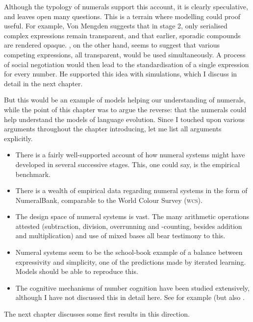 \documentclass{../src/bcthesispart}
\begin{document}


Although the typology of numerals support this account, it is clearly speculative, and leaves open many questions.
This is a terrain where modelling could proof useful.
For example, Von Mengden suggests that in stage 2, only serialised complex expressions remain transparent, and that earlier, sporadic compounds are rendered opaque. 
\textcite{Hurford1987}, on the other hand, seems to suggest that various competing expressions, all transparent, would be used simultaneously.
A process of social negotiation would then lead to the standardisation of a single expression for every number.
He supported this idea with simulations, which I discuss in detail in the next chapter.




But this would be an example of models helping our understanding of numerals, while the point of this chapter was to argue the reverse: that the numerals could help understand the models of language evolution.
Since I touched upon various arguments throughout the chapter introducing, let me list all arguments explicitly.
\begin{itemize}
\item There is a fairly well-supported account of how numeral systems might have developed in several successive stages. This, one could say, is the empirical benchmark.

\item There is a wealth of empirical data regarding numeral systems in the form of NumeralBank, comparable to the World Colour Survey (\textsc{wcs}). 


\item The design space of numeral systems is vast. The many arithmetic operations attested (subtraction, division, overrunning and -counting, besides addition and multiplication) and use of mixed bases all bear testimony to this. 

\item Numeral systems seem to be the school-book example of a balance between expressivity and simplicity, one of the predictions made by iterated learning. Models should be able to reproduce this.

\item The cognitive mechanisms of number cognition have  been studied extensively, although I have not discussed this in detail here. See for example \textcite{Dehaene2011} (but also \cite{Hurford1987}.
\end{itemize}




The next chapter discusses some first results in this direction.

\showbibliography
\end{document}
